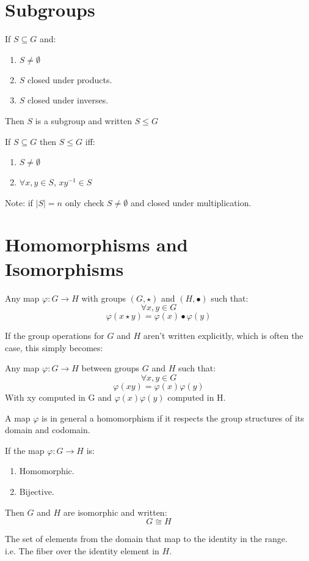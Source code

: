 \section{Subgroups}
\begin{defn}[Subgroup]
	If $S \subseteq G$ and:
	\begin{enumerate}
		\item $S \not = \emptyset$
		\item $S$ closed under products.
		\item $S$ closed under inverses.
	\end{enumerate}
	Then $S$ is a subgroup and written $S \leq G$
\end{defn}

\begin{prop}
	If $S \subseteq G$ then $S \leq G$ iff:
	\begin{enumerate}
		\item $S \not = \emptyset$
		\item $ \forall x, y \in S$, $x{y}^{-1} \in S$
	\end{enumerate}
	Note: if $|S| = n$ only check $S \not = \emptyset$ and closed under multiplication.
\end{prop}

\section{Homomorphisms and Isomorphisms}
\begin{defn}[Homomorphism]
	Any map $\varphi: G \to H $ with groups $(G, \star)$ and $(H, \bullet)$ such that:
	\[\forall x, y \in G\]
	\[\varphi(x \star y) = \varphi(x)\bullet\varphi(y) \]
\end{defn}
If the group operations for $G$ and $H$ aren't written explicitly, which is often the case, this simply becomes:
\begin{defn}
	Any map $\varphi: G \to H$ between groups $G$ and $H$ such that:
	\[ \forall x, y \in G \]
	\[ \varphi(xy) = \varphi(x) \varphi(y) \]
	With xy computed in G and $\varphi(x) \varphi(y)$ computed in H.
\end{defn}
A map $\varphi$ is in general a homomorphism if it respects the group structures of its domain and codomain.

\begin{defn}[Isomorphism]
	If the map $\varphi: G \to H$ is:
	\begin{enumerate}
		\item Homomorphic.
		\item Bijective.
	\end{enumerate}
Then $G$ and $H$ are isomorphic and written:
\[G \cong H\]
\end{defn}

\begin{defn}
	The set of elements from the domain that map to the identity in the range. \\
	
	i.e. The fiber over the identity element in $H$.
\end{defn}